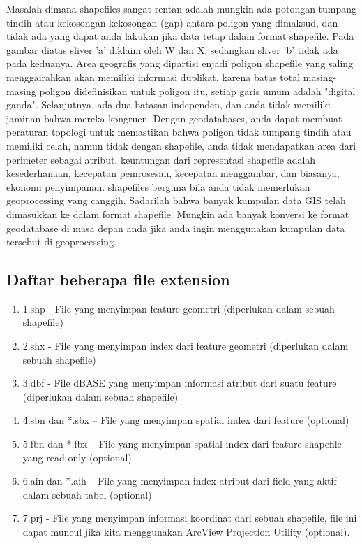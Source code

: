 Masalah dimana shapefiles sangat rentan adalah mungkin ada potongan tumpang tindih atau kekosongan-kekosongan (gap) antara poligon yang dimaksud, dan tidak ada yang dapat anda lakukan jika data tetap dalam format shapefile. Pada gambar diatas sliver 'a' diklaim oleh W dan X, sedangkan sliver 'b' tidak ada pada keduanya. Area geografis yang dipartisi enjadi poligon shapefile yang saling menggairahkan akan memiliki informasi duplikat. karena batas total masing-masing poligon didefinisikan untuk poligon itu, setiap garis umum adalah "digital ganda". Selanjutnya, ada dua batasan independen, dan anda tidak memiliki jaminan bahwa mereka kongruen. Dengan geodatabases, anda dapat membuat peraturan topologi untuk memastikan bahwa poligon tidak tumpang tindih atau memiliki celah, namun tidak dengan shapefile, anda tidak mendapatkan area dari perimeter sebagai atribut. keuntungan dari representasi shapefile adalah kesederhanaan, kecepatan pemrosesan, kecepatan menggambar, dan biasanya, ekonomi penyimpanan. shapefiles berguna bila anda tidak memerlukan geoprocessing yang canggih. Sadarilah bahwa banyak kumpulan data GIS telah dimasukkan ke dalam format shapefile. Mungkin ada banyak konversi ke format geodatabase di masa depan anda jika anda ingin menggunakan kumpulan data tersebut di geoprocessing.\cite{kennedy2013introducing}

\subsection{Daftar beberapa file extension}
\begin{enumerate}
    \item 1.shp - File yang menyimpan feature geometri (diperlukan dalam sebuah shapefile) 
    \item 2.shx - File yang menyimpan index dari feature geometri (diperlukan dalam sebuah shapefile) 
    \item 3.dbf - File dBASE yang menyimpan informasi atribut dari suatu feature (diperlukan dalam sebuah shapefile) 
    \item 4.sbn dan *.sbx – File yang menyimpan spatial index dari feature (optional) 
    \item 5.fbn dan *.fbx – File yang menyimpan spatial index dari feature shapefile yang read-only (optional) 
    \item 6.ain dan *.aih – File yang menyimpan index atribut dari field yang aktif dalam sebuah tabel (optional) 
    \item 7.prj - File yang menyimpan informasi koordinat dari sebuah shapefile, file ini dapat muncul jika kita menggunakan ArcView Projection Utility (optional). \cite{surya2013sistem}
\end{enumerate} 

